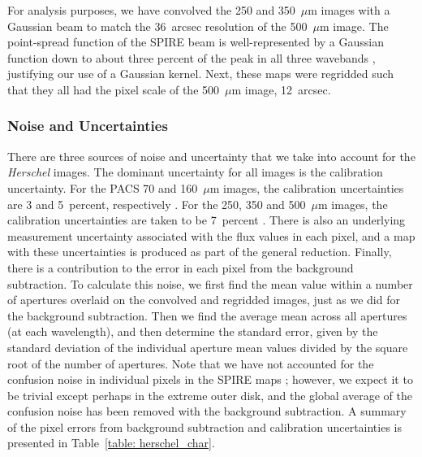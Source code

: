 \documentclass[useAMS,usenatbib,usegraphicx]{mn2e}
\begin{document}
For analysis purposes, we have convolved the 250 and 350~$\mu$m images with a Gaussian beam to match the 36~arcsec resolution of the 500~$\mu$m image.  The point-spread function of the SPIRE beam is well-represented by a Gaussian function down to about three percent of the peak in all three wavebands \citep{2010A&A...518L...3G}, justifying our use of a Gaussian kernel.  Next, these maps were regridded such that they all had the pixel scale of the 500~$\mu$m image, 12~arcsec.

\subsubsection{Noise and Uncertainties}\label{subsec:Noise}
There are three sources of noise and uncertainty that we take into account for the \emph{Herschel} images.  The dominant uncertainty for all images is the calibration uncertainty.  For the PACS 70 and 160~$\mu$m images, the calibration uncertainties are 3 and 5~percent, respectively \citep{PACS_OM}.  For the 250, 350 and 500~$\mu$m images, the calibration uncertainties are taken to be 7~percent \citep{SOM_2010}.  There is also an underlying measurement uncertainty associated with the flux values in each pixel, and a map with these uncertainties is produced as part of the general reduction.  Finally, there is a contribution to the error in each pixel from the background subtraction.  To calculate this noise, we first find the mean value within a number of apertures overlaid on the convolved and regridded images, just as we did for the background subtraction.  Then we find the average mean across all apertures (at each wavelength), and then determine the standard error, given by the standard deviation of the individual aperture mean values divided by the square root of the number of apertures.  Note that we have not accounted for the confusion noise in individual pixels in the SPIRE maps \citep[see ][]{2010A&A...518L...5N}; however, we expect it to be trivial except perhaps in the extreme outer disk, and the global average of the confusion noise has been removed with the background subtraction.  A summary of the pixel errors from background subtraction and calibration uncertainties is presented in Table~\ref{table: herschel_char}.
\end{document}
